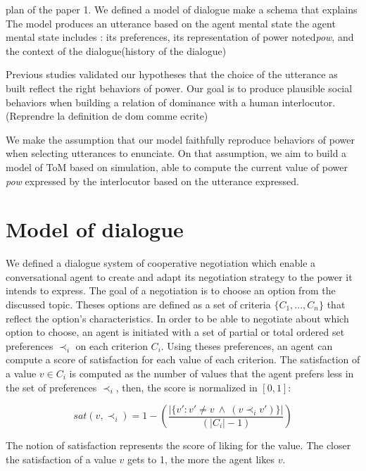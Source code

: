 \documentclass{llncs}
\begin{document}
	plan of the paper
	1. We defined a model of dialogue make a schema that explains 
	The model produces an utterance based on the agent mental state
	the agent mental state includes : its preferences, its representation of power noted\emph{pow}, and the context of the dialogue(history of the dialogue)
	
	Previous studies validated our hypotheses that the choice of the utterance as built reflect the right behaviors of power.
	Our goal is to produce plausible social behaviors when building a relation of dominance with a human interlocutor. 
	(Reprendre la definition de dom comme ecrite) 
	
	We make the assumption that our model faithfully reproduce behaviors of power when selecting utterances to enunciate. On that assumption, we aim to build a model of ToM based on simulation, able to compute the current value of power \emph{pow} expressed by the interlocutor based on the utterance expressed. 
	
	\section{Model of dialogue}
		
		We defined a dialogue system of cooperative negotiation which enable  a conversational agent to create and adapt its negotiation strategy to the power it intends to express. The goal of a negotiation is to choose an option from the discussed topic. Theses options are defined as a set of criteria  $\{C_1, ..., C_n\}$ that reflect the option's characteristics. In order to be able to negotiate about which option to choose, an agent is initiated with a set of partial or total ordered set preferences $\prec_i$ on each criterion $C_i$. Using theses preferences, an agent can compute a score of satisfaction for each value of each criterion. The satisfaction of a value $v \in C_i$ is computed as the number of values that the agent prefers less in the set of preferences $\prec_i$, then, the score is normalized in $[0, 1]$: 
		
				\begin{equation}
				sat(v, \prec_i) =	1 - \left( \frac{|\{v' : v' \neq v \  \wedge \ (v \prec_i v')\}| }{( |C_i| - 1 )}\right)
				\end{equation}
				
		The notion of satisfaction represents the score of liking for the value. The closer the satisfaction of a value $v$ gets to 1, the more the agent likes $v$. 
		
\end{document}
